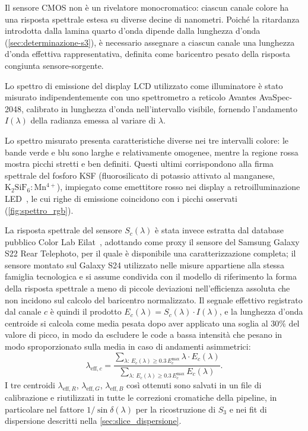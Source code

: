 Il sensore CMOS non è un rivelatore monocromatico: ciascun canale colore ha una risposta spettrale estesa su diverse decine di nanometri. Poiché la ritardanza introdotta dalla lamina quarto d'onda dipende dalla lunghezza d'onda (\cref{sec:determinazione-s3}), è necessario assegnare a ciascun canale una lunghezza d'onda effettiva rappresentativa, definita come baricentro pesato della risposta congiunta sensore-sorgente.

Lo spettro di emissione del display LCD utilizzato come illuminatore è stato misurato indipendentemente con uno spettrometro a reticolo Avantes AvaSpec-2048, calibrato in lunghezza d'onda nell'intervallo visibile, fornendo l'andamento $I(\lambda)$ della radianza emessa al variare di $\lambda$.

Lo spettro misurato presenta caratteristiche diverse nei tre intervalli colore: le bande verde e blu sono larghe e relativamente omogenee, mentre la regione rossa mostra picchi stretti e ben definiti. Questi ultimi corrispondono alla firma spettrale del fosforo KSF (fluorosilicato di potassio attivato al manganese, $\mathrm{K_2SiF_6{:}Mn^{4+}}$), impiegato come emettitore rosso nei display a retroilluminazione LED~\cite{Wang2015phosphor}, le cui righe di emissione coincidono con i picchi osservati (\cref{fig:spettro_rgb}).

La risposta spettrale del sensore $S_c(\lambda)$ è stata invece estratta dal database pubblico Color Lab Eilat~\cite{Solomatov2023spectral}, adottando come proxy il sensore del Samsung Galaxy S22 Rear Telephoto, per il quale è disponibile una caratterizzazione completa; il sensore montato sul Galaxy S24 utilizzato nelle misure appartiene alla stessa famiglia tecnologica e si assume condivida con il modello di riferimento la forma della risposta spettrale a meno di piccole deviazioni nell'efficienza assoluta che non incidono sul calcolo del baricentro normalizzato. Il segnale effettivo registrato dal canale $c$ è quindi il prodotto $E_c(\lambda) = S_c(\lambda) \cdot I(\lambda)$, e la lunghezza d'onda centroide si calcola come media pesata dopo aver applicato una soglia al $30\%$ del valore di picco, in modo da escludere le code a bassa intensità che pesano in modo sproporzionato sulla media in caso di andamenti asimmetrici:
\begin{equation}
    \lambda_{\mathrm{eff},c} = \frac{\displaystyle\sum_{\lambda:\,E_c(\lambda) \geq 0.3\,E_c^{\max}} \lambda \cdot E_c(\lambda)}{\displaystyle\sum_{\lambda:\,E_c(\lambda) \geq 0.3\,E_c^{\max}} E_c(\lambda)}.
    \label{eq:centroide}
\end{equation}
I tre centroidi $\lambda_{\mathrm{eff},R}$, $\lambda_{\mathrm{eff},G}$, $\lambda_{\mathrm{eff},B}$ così ottenuti sono salvati in un file di calibrazione e riutilizzati in tutte le correzioni cromatiche della pipeline, in particolare nel fattore $1/\sin\delta(\lambda)$ per la ricostruzione di $S_3$ e nei fit di dispersione descritti nella \cref{sec:slice_dispersione}.


